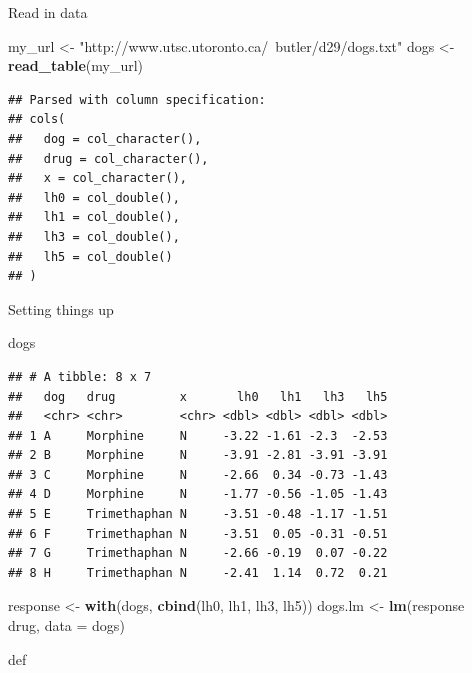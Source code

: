 \documentclass[ignorenonframetext,]{beamer}
\newenvironment{Shaded}{\begin{snugshade}}{\end{snugshade}}
\newcommand{\DataTypeTok}[1]{\textcolor[rgb]{0.13,0.29,0.53}{#1}}
\newcommand{\KeywordTok}[1]{\textcolor[rgb]{0.13,0.29,0.53}{\textbf{#1}}}
\newcommand{\NormalTok}[1]{#1}
\newcommand{\OperatorTok}[1]{\textcolor[rgb]{0.81,0.36,0.00}{\textbf{#1}}}
\newcommand{\StringTok}[1]{\textcolor[rgb]{0.31,0.60,0.02}{#1}}
\begin{document}
\begin{frame}[fragile]{Read in data}
\protect\hypertarget{read-in-data-1}{}

\begin{Shaded}
\begin{Highlighting}[]
\NormalTok{my_url <-}\StringTok{ "http://www.utsc.utoronto.ca/~butler/d29/dogs.txt"}
\NormalTok{dogs <-}\StringTok{ }\KeywordTok{read_table}\NormalTok{(my_url)}
\end{Highlighting}
\end{Shaded}

\begin{verbatim}
## Parsed with column specification:
## cols(
##   dog = col_character(),
##   drug = col_character(),
##   x = col_character(),
##   lh0 = col_double(),
##   lh1 = col_double(),
##   lh3 = col_double(),
##   lh5 = col_double()
## )
\end{verbatim}

\end{frame}

\begin{frame}[fragile]{Setting things up}
\protect\hypertarget{setting-things-up}{}

\begin{Shaded}
\begin{Highlighting}[]
\NormalTok{dogs}
\end{Highlighting}
\end{Shaded}

\begin{verbatim}
## # A tibble: 8 x 7
##   dog   drug         x       lh0   lh1   lh3   lh5
##   <chr> <chr>        <chr> <dbl> <dbl> <dbl> <dbl>
## 1 A     Morphine     N     -3.22 -1.61 -2.3  -2.53
## 2 B     Morphine     N     -3.91 -2.81 -3.91 -3.91
## 3 C     Morphine     N     -2.66  0.34 -0.73 -1.43
## 4 D     Morphine     N     -1.77 -0.56 -1.05 -1.43
## 5 E     Trimethaphan N     -3.51 -0.48 -1.17 -1.51
## 6 F     Trimethaphan N     -3.51  0.05 -0.31 -0.51
## 7 G     Trimethaphan N     -2.66 -0.19  0.07 -0.22
## 8 H     Trimethaphan N     -2.41  1.14  0.72  0.21
\end{verbatim}

\begin{Shaded}
\begin{Highlighting}[]
\NormalTok{response <-}\StringTok{ }\KeywordTok{with}\NormalTok{(dogs, }\KeywordTok{cbind}\NormalTok{(lh0, lh1, lh3, lh5))}
\NormalTok{dogs.lm <-}\StringTok{ }\KeywordTok{lm}\NormalTok{(response }\OperatorTok{~}\StringTok{ }\NormalTok{drug, }\DataTypeTok{data =}\NormalTok{ dogs)}
\end{Highlighting}
\end{Shaded}

def

\end{frame}
\end{document}
